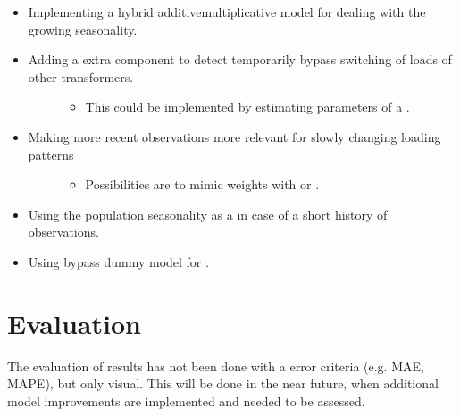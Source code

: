 \documentclass[letterpaper,10pt,english]{sphinxmanual}
\begin{document}
\begin{itemize}
\item {} 
Implementing a hybrid additive\sphinxhyphen{}multiplicative model for dealing with the growing seasonality.

\item {} \begin{description}
\item[{Adding a extra component to detect temporarily bypass switching of loads of other transformers.}] \leavevmode\begin{itemize}
\item {} 
This could be implemented by estimating parameters of a .

\end{itemize}

\end{description}

\item {} \begin{description}
\item[{Making more recent observations more relevant for slowly changing loading patterns}] \leavevmode\begin{itemize}
\item {} 
Possibilities are to mimic weights with  or .

\end{itemize}

\end{description}

\item {} 
Using the population seasonality as a  in case of a short history of observations.

\item {} 
Using by\sphinxhyphen{}pass dummy model for .

\end{itemize}


\chapter{Evaluation}
\label{\detokenize{evaluation:evaluation}}\label{\detokenize{evaluation::doc}}
The evaluation of results has not been done with a error criteria (e.g. MAE, MAPE), but only visual.
This will be done in the near future, when additional model improvements are implemented and needed to be assessed.
\end{document}
